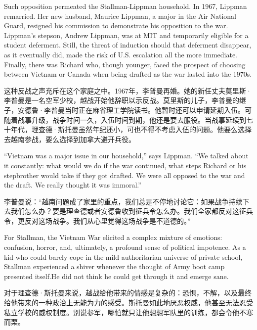 \ifdefined\eng
Such opposition permeated the Stallman-Lippman household. In 1967, Lippman remarried. Her new husband, Maurice Lippman, a major in the Air National Guard, resigned his commission to demonstrate his opposition to the war. Lippman's stepson, Andrew Lippman, was at MIT and temporarily eligible for a student deferment. Still, the threat of induction should that deferment disappear, as it eventually did, made the risk of U.S. escalation all the more immediate. Finally, there was Richard who, though younger, faced the prospect of \ifdefined\vone choosing between Vietnam or Canada when \fi\ifdefined\vtwo being drafted as \fi the war lasted into the 1970s.
\fi

\ifdefined\chs
这种反战之声充斥在这个家庭之中。1967年，李普曼再婚。她的新任丈夫莫里斯·李普曼是一名空军少校，越战开始他辞职以示反战。莫里斯的儿子，李普曼的继子，安德鲁·李普曼当时正在麻省理工学院读书。他暂时还可以申请延期入伍。可随着战事升级，战争时间一久，入伍时间到期，他还是要去服役。当战事延续到七十年代，理查德·斯托曼虽然年纪还小，可也不得不考虑入伍的问题。他要么选择去越南参战，要么选择到加拿大避开兵役。
\fi

\ifdefined\eng
``Vietnam was a major issue in our household,'' says Lippman. ``We talked about it constantly: what would we do if the war continued, what steps Richard or his stepbrother would take if they got drafted. We were all opposed to the war and the draft. We really thought it was immoral.''
\fi

\ifdefined\chs
李普曼说：``越南问题成了家里的重点，我们总是不停地讨论它：如果战争持续下去我们怎么办？要是理查德或者安德鲁收到征兵令怎么办。我们全家都反对这征兵令，更反对这场战争。我们从心里觉得这场战争是不道德的。''
\fi

\ifdefined\eng
For Stallman, the Vietnam War elicited a complex mixture of emotions: confusion, horror, and, ultimately, a profound sense of political impotence. As a kid who could barely cope in the mild authoritarian universe of private school, Stallman experienced a shiver whenever the thought of Army boot camp presented itself.\ifdefined\vtwo He did not think he could get through it and emerge sane.\fi
\fi

\ifdefined\chs
对于理查德·斯托曼来说，越战给他带来的情感是复杂的：恐惧，不解，以及最终给他带来的一种政治上无能为力的感受。斯托曼如此地厌恶权威，他甚至无法忍受私立学校的威权制度。别说参军，哪怕就只让他想想军队里的训练，都会令他不寒而栗。
\fi

